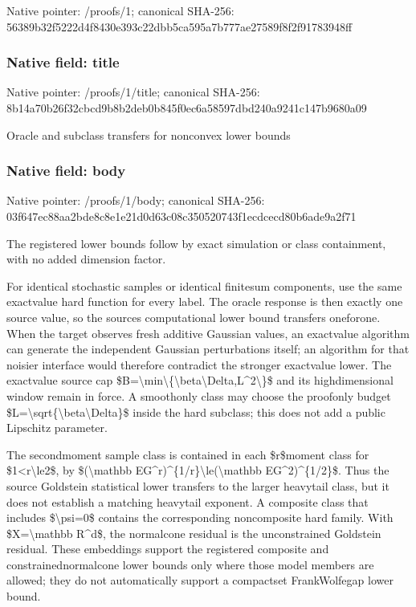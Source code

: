 \documentclass[10pt,a4paper]{article}
\begin{document}
Native pointer: /proofs/1; canonical SHA-256: 56389b32f5222d4f8430e393\allowbreak{}c22dbb5ca595a7b777ae2758\allowbreak{}9f8f2f91783948ff



\subsubsection{Native field: title}


Native pointer: /proofs/1/title; canonical SHA-256: 8b14a70b26f32cbcd9b8b2de\allowbreak{}b0b845f0ec6a58597dbd240a\allowbreak{}9241c147b9680a09


Oracle and subclass transfers for nonconvex lower bounds


\subsubsection{Native field: body}


Native pointer: /proofs/1/body; canonical SHA-256: 03f647ec88aa2bde8c8e1e21\allowbreak{}d0d63c08c350520743f1ecdc\allowbreak{}ecd80b6ade9a2f71


The registered lower bounds follow by exact simulation or class containment, with no added dimension factor.

For identical stochastic samples or identical finitesum components, use the same exactvalue hard function for every label. The oracle response is then exactly one source value, so the sources computational lower bound transfers oneforone. When the target observes fresh additive Gaussian values, an exactvalue algorithm can generate the independent Gaussian perturbations itself; an algorithm for that noisier interface would therefore contradict the stronger exactvalue lower. The exactvalue source cap \$B=\textbackslash{}min\textbackslash{}\{\textbackslash{}beta\textbackslash{}Delta,L\textasciicircum{}2\textbackslash{}\}\$ and its highdimensional window remain in force. A smoothonly class may choose the proofonly budget \$L=\textbackslash{}sqrt\{\textbackslash{}beta\textbackslash{}Delta\}\$ inside the hard subclass; this does not add a public Lipschitz parameter.

The secondmoment sample class is contained in each \$r\$moment class for \$1<r\textbackslash{}le2\$, by \$(\textbackslash{}mathbb EG\textasciicircum{}r)\textasciicircum{}\{1/r\}\textbackslash{}le(\textbackslash{}mathbb EG\textasciicircum{}2)\textasciicircum{}\{1/2\}\$. Thus the source Goldstein statistical lower transfers to the larger heavytail class, but it does not establish a matching heavytail exponent. A composite class that includes \$\textbackslash{}psi=0\$ contains the corresponding noncomposite hard family. With \$X=\textbackslash{}mathbb R\textasciicircum{}d\$, the normalcone residual is the unconstrained Goldstein residual. These embeddings support the registered composite and constrainednormalcone lower bounds only where those model members are allowed; they do not automatically support a compactset FrankWolfegap lower bound.
\end{document}
